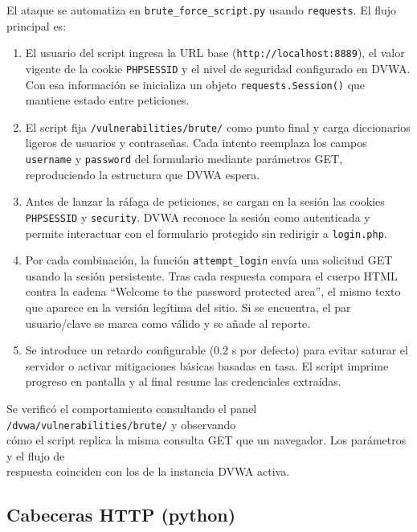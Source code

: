 \documentclass[letterpaper,12pt]{article}
\let\origsubsection\subsection
\renewcommand{\subsection}{\FloatBarrier\origsubsection}
\begin{document}
El ataque se automatiza en \verb|brute_force_script.py| usando \verb|requests|. El flujo principal es:
\begin{enumerate}
    \item El usuario del script ingresa la URL base (\verb|http://localhost:8889|), el valor vigente de la cookie \verb|PHPSESSID| y el nivel de seguridad configurado en DVWA. Con esa información se inicializa un objeto \verb|requests.Session()| que mantiene estado entre peticiones.
    \item El script fija \verb|/vulnerabilities/brute/| como punto final y carga diccionarios ligeros de usuarios y contraseñas. Cada intento reemplaza los campos \verb|username| y \verb|password| del formulario mediante parámetros GET, reproduciendo la estructura que DVWA espera.
    \item Antes de lanzar la ráfaga de peticiones, se cargan en la sesión las cookies \verb|PHPSESSID| y \verb|security|. DVWA reconoce la sesión como autenticada y permite interactuar con el formulario protegido sin redirigir a \verb|login.php|.
    \item Por cada combinación, la función \verb|attempt_login| envía una solicitud GET usando la sesión persistente. Tras cada respuesta compara el cuerpo HTML contra la cadena ``Welcome to the password protected area'', el mismo texto que aparece en la versión legítima del sitio. Si se encuentra, el par usuario/clave se marca como válido y se añade al reporte.
    \item Se introduce un retardo configurable (0.2 s por defecto) para evitar saturar el servidor o activar mitigaciones básicas basadas en tasa. El script imprime progreso en pantalla y al final resume las credenciales extraídas.
\end{enumerate}

Se verificó el comportamiento consultando el panel \verb|/dvwa/vulnerabilities/brute/| y observando \\
cómo el script replica la misma consulta GET que un navegador. Los parámetros y el flujo de \\
respuesta coinciden con los de la instancia DVWA activa.

\subsection{Cabeceras HTTP (python)}
\end{document}
